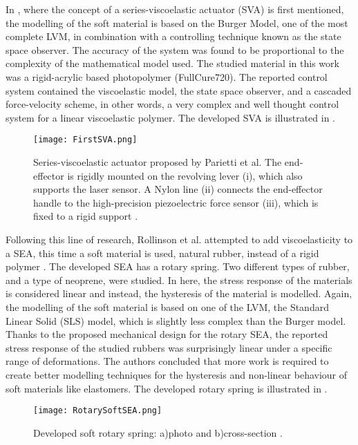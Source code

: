 In \cite{parietti2011series}, where the concept of a series-viscoelastic actuator (SVA) is first mentioned, the modelling of the soft material is based on the Burger Model, one of the most complete LVM, in combination with a controlling technique known as the state space observer. The accuracy of the system was found to be proportional to the complexity of the mathematical model used. The studied material in this work was a rigid-acrylic based photopolymer (FullCure720). The reported control system contained the viscoelastic model, the state space observer, and a cascaded force-velocity scheme, in other words, a very complex and well thought control system for a linear viscoelastic polymer. The developed SVA is illustrated in . 

\begin{figure}[htb!]
    \centering
    \texttt{[image: FirstSVA.png]}
    \caption{Series-viscoelastic actuator proposed by Parietti et al. The end-effector is rigidly mounted on the revolving lever (i), which also supports the laser sensor. A Nylon line (ii) connects the end-effector handle to the high-precision piezoelectric force sensor (iii), which is fixed to a rigid support \cite{parietti2011series}.}
    \label{fig:firstSVA}
\end{figure}

Following this line of research, Rollinson et al. attempted to add viscoelasticity to a SEA, this time a soft material is used, natural rubber, instead of a rigid polymer \cite{rollinson2013design}. The developed SEA has a rotary spring. Two different types of rubber, and a type of neoprene, were studied. In here, the stress response of the materials is considered linear and instead, the hysteresis of the material is modelled. Again, the modelling of the soft material is based on one of the LVM, the Standard Linear Solid (SLS) model, which is slightly less complex than the Burger model. Thanks to the proposed mechanical design for the rotary SEA, the reported stress response of the studied rubbers was surprisingly linear under a specific range of deformations. The authors concluded that more work is required to create better modelling techniques for the hysteresis and non-linear behaviour of soft materials like elastomers. The developed rotary spring is illustrated in .

\begin{figure}[htb!]
    \centering
    \texttt{[image: RotarySoftSEA.png]}
    \caption{Developed soft rotary spring: a)photo and b)cross-section \cite{rollinson2013design}.}
    \label{fig:rotarySoftSEA}
\end{figure}

